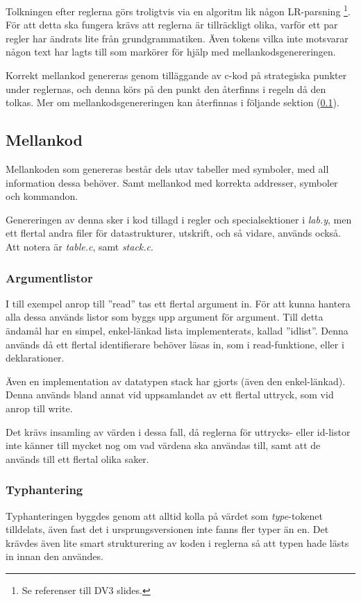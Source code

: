 		Tolkningen efter reglerna görs troligtvis via en algoritm lik någon LR-parsning \footnote{Se referenser till DV3 slides.}. För att detta ska fungera krävs att reglerna är tillräckligt olika, varför ett par regler har ändrats lite från grundgrammatiken. Även tokens vilka inte motsvarar någon text har lagts till som markörer för hjälp med mellankodsgenereringen.
		
		Korrekt mellankod genereras genom tilläggande av c-kod på strategiska punkter under reglernas, och denna körs på den  punkt den återfinns i regeln då den tolkas. Mer om mellankodsgenereringen kan återfinnas i följande sektion (\ref{Sec:mel}).
		
	\subsection{Mellankod}
		\label{Sec:mel}
		
		Mellankoden som genereras består dels utav tabeller med symboler, med all information dessa behöver. Samt mellankod med korrekta addresser, symboler och kommandon.
		
		Genereringen av denna sker i kod tillagd i regler och specialsektioner i \textit{lab.y}, men ett flertal andra filer för datastrukturer, utskrift, och så vidare, används också. Att notera är \textit{table.c}, samt \textit{stack.c}.
		
	\subsubsection{Argumentlistor}
		I till exempel anrop till ''read'' tas ett flertal argument in. För att kunna hantera alla dessa används listor som byggs upp argument för argument. Till detta ändamål har en simpel, enkel-länkad lista implementerats, kallad ''idlist''. Denna används då ett flertal identifierare behöver läsas in, som i read-funktione, eller i deklarationer.
		
		Även en implementation av datatypen stack har gjorts (även den enkel-länkad). Denna används bland annat vid uppsamlandet av ett flertal uttryck, som vid anrop till write.
		
		Det krävs insamling av värden i dessa fall, då reglerna för uttrycks- eller id-listor inte känner till mycket nog om vad värdena ska användas till, samt att de används till ett flertal olika saker.
	
	\subsubsection{Typhantering}
		Typhanteringen byggdes genom att alltid kolla på värdet som \textit{type}-tokenet tilldelats, även fast det i ursprungsversionen inte fanns fler typer än en. Det krävdes även lite smart strukturering av koden i reglerna så att typen hade lästs in innan den användes.
		
